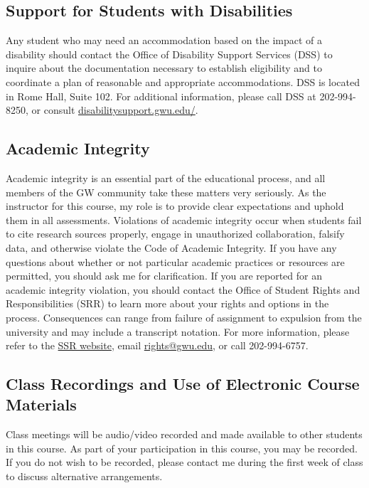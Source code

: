 \documentclass[12pt,letterpaper]{article}
\begin{document}
\subsection*{Support for Students with Disabilities}

Any student who may need an accommodation based on the impact of a disability should contact the Office of Disability Support Services (DSS) to inquire about the documentation necessary to establish eligibility and to coordinate a plan of reasonable and appropriate accommodations. DSS is located in Rome Hall, Suite 102. For additional information, please call DSS at 202-994-8250, or consult \href{https://disabilitysupport.gwu.edu/}{disabilitysupport.gwu.edu/}.

\subsection*{Academic Integrity}

Academic integrity is an essential part of the educational process, and all members of the GW community take these matters very seriously. As the instructor for this course, my role is to provide clear expectations and uphold them in all assessments. Violations of academic integrity occur when students fail to cite research sources properly, engage in unauthorized collaboration, falsify data, and otherwise violate the Code of Academic Integrity. If you have any questions about whether or not particular academic practices or resources are permitted, you should ask me for clarification. If you are reported for an academic integrity violation, you should contact the Office of Student Rights and Responsibilities (SRR) to learn more about your rights and options in the process. Consequences can range from failure of assignment to expulsion from the university and may include a transcript notation. For more information, please refer to the \href{https://studentconduct.gwu.edu/academic-integrity}{SSR website}, email \href{mailto:rights@gwu.edu}{rights@gwu.edu}, or call 202-994-6757. 

\subsection*{Class Recordings and Use of Electronic Course Materials}

Class meetings will be audio/video recorded and made available to other students in this course. As part of your participation in this course, you may be recorded. If you do not wish to be recorded, please contact me during the first week of class to discuss alternative arrangements. \par
\end{document}
